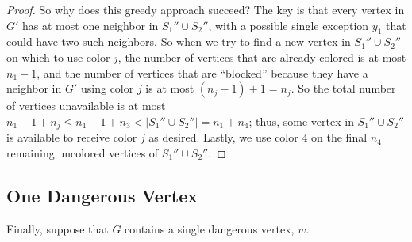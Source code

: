 \documentclass[11pt]{article}
\theoremstyle{definition}
\renewcommand\le\leqslant
\begin{document}
\begin{proof}
	So why does this greedy approach succeed?  The key is that every vertex in $G'$
	has at most one neighbor in $S_1''\cup S_2''$, with a possible single exception $y_1$ that could have two such neighbors.  So when we try to find
	a new vertex in $S_1''\cup S_2''$ on which to use color $j$, the number of vertices that are already colored is at most $n_1-1$, and the number of
	vertices that are ``blocked'' because they have a neighbor in $G'$ using color $j$ is at most $(n_j-1)+1=n_j$.  So the total number of vertices
	unavailable is at most $n_1-1+n_j\le n_1-1+n_3<|S_1''\cup S_2''| = n_1+n_4$; thus, some vertex in $S_1''\cup S_2''$ is available to receive color 
	$j$ as desired.  Lastly, we use color $4$ on the final $n_4$ remaining uncolored vertices of $S_1''\cup S_2''$.
\end{proof}


\subsection{One Dangerous Vertex}
\label{one-dangerous-sec}
Finally, suppose that $G$ contains a single dangerous vertex, $w$.
\end{document}
